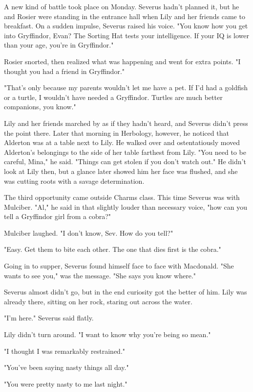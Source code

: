 \documentclass[a4paper,11pt]{article}
\begin{document}
A new kind of battle took place on Monday. Severus hadn't planned it, but he and Rosier were standing in the entrance hall when Lily and her friends came to breakfast. On a sudden impulse, Severus raised his voice. "You know how you get into Gryffindor, Evan? The Sorting Hat tests your intelligence. If your IQ is lower than your age, you're in Gryffindor."

Rosier snorted, then realized what was happening and went for extra points. "I thought you had a friend in Gryffindor."

"That's only because my parents wouldn't let me have a pet. If I'd had a goldfish or a turtle, I wouldn't have needed a Gryffindor. Turtles are much better companions, you know."

Lily and her friends marched by as if they hadn't heard, and Severus didn't press the point there. Later that morning in Herbology, however, he noticed that Alderton was at a table next to Lily. He walked over and ostentatiously moved Alderton's belongings to the side of her table farthest from Lily. "You need to be careful, Mina," he said. "Things can get stolen if you don't watch out." He didn't look at Lily then, but a glance later showed him her face was flushed, and she was cutting roots with a savage determination.

The third opportunity came outside Charms class. This time Severus was with Mulciber. "Al," he said in that slightly louder than necessary voice, "how can you tell a Gryffindor girl from a cobra?"

Mulciber laughed. "I don't know, Sev. How do you tell?"

"Easy. Get them to bite each other. The one that dies first is the cobra."

Going in to supper, Severus found himself face to face with Macdonald. "She wants to see you," was the message. "She says you know where."

Severus almost didn't go, but in the end curiosity got the better of him. Lily was already there, sitting on her rock, staring out across the water.

"I'm here." Severus said flatly.

Lily didn't turn around. "I want to know why you're being so mean."

"I thought I was remarkably restrained."

"You've been saying nasty things all day."

"You were pretty nasty to me last night."
\end{document}
